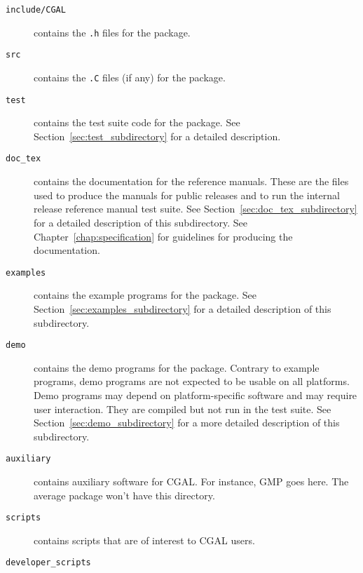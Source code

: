\begin{description}
  \item[{\tt include/CGAL}]
       contains the {\tt .h} files for the package.
  \item[{\tt src}]
       contains the {\tt .C} files (if any) for the package.
     \item[{\tt test}] contains the test suite code for the package. See
       Section~\ref{sec:test_subdirectory} for a detailed description.
  \item[{\tt doc\_tex}]
       contains the documentation for the reference manuals.
       These are the files used to produce the manuals for public releases and
       to run the internal release reference manual test suite.
       See Section~\ref{sec:doc_tex_subdirectory} for a detailed description 
       of this subdirectory.
       See Chapter~\ref{chap:specification} for guidelines for producing
       the documentation.
  \item[{\tt examples}]
       contains the example programs for the package.
       See Section~\ref{sec:examples_subdirectory} for a detailed 
       description of this subdirectory.
  \item[{\tt demo}]
       contains the demo programs for the package.
       Contrary to example programs, demo programs are not expected to be
       usable on all platforms. Demo programs may depend on platform-specific
       software and may require user interaction.  They are compiled but not
       run in the test suite. See Section~\ref{sec:demo_subdirectory} for a
       more detailed description of this subdirectory.
     \item[{\tt auxiliary}] contains auxiliary software for CGAL. For
       instance, GMP goes here. The average package won't have this
       directory.
     \item[{\tt scripts}] contains scripts that are of interest to CGAL
       users.
     \item[{\tt developer\_scripts}]
\end{description}

